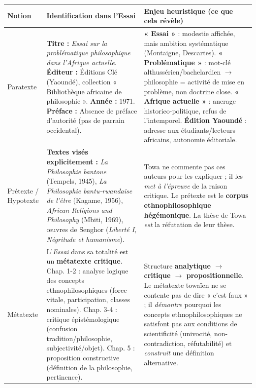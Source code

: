 \documentclass[11pt]{article}
\newcommand{\cle}[1]{{\popxbold\color{popdark}#1}}
\begin{document}
\begin{center}
\begin{tabularx}{\linewidth}{|l|X|X|}
\hline
\rowcolor{popblueL}
\textbf{Notion} & \textbf{Identification dans l'Essai} & \textbf{Enjeu heuristique (ce que cela révèle)} \\
\hline
\cle{Paratexte} & \textbf{Titre :} \emph{Essai sur la problématique philosophique dans l'Afrique actuelle}. \textbf{Éditeur :} Éditions Clé (Yaoundé), collection « Bibliothèque africaine de philosophie ». \textbf{Année :} 1971. \textbf{Préface :} Absence de préface d'autorité (pas de parrain occidental). & \textbf{« Essai »} : modestie affichée, mais ambition systématique (Montaigne, Descartes). \textbf{« Problématique »} : mot-clé althussérien/bachelardien $\rightarrow$ philosophie = activité de mise en problème, non doctrine close. \textbf{« Afrique actuelle »} : ancrage historico-politique, refus de l'intemporel. \textbf{Édition Yaoundé} : adresse aux étudiants/lecteurs africains, autonomie éditoriale. \\
\hline
\cle{Prétexte / Hypotexte} & \textbf{Textes visés explicitement :} \emph{La Philosophie bantoue} (Tempels, 1945), \emph{La Philosophie bantu-rwandaise de l'être} (Kagame, 1956), \emph{African Religions and Philosophy} (Mbiti, 1969), œuvres de Senghor (\emph{Liberté I}, \emph{Négritude et humanisme}). & Towa ne commente pas ces auteurs pour les expliquer ; il les \emph{met à l'épreuve} de la raison critique. Le prétexte est le \textbf{corpus ethnophilosophique hégémonique}. La thèse de Towa \emph{est} la réfutation de leur thèse. \\
\hline
\cle{Métatexte} & L'\emph{Essai} dans sa totalité est un \textbf{métatexte critique}. Chap. 1-2 : analyse logique des concepts ethnophilosophiques (force vitale, participation, classes nominales). Chap. 3-4 : critique épistémologique (confusion tradition/philosophie, subjectivité/objet). Chap. 5 : proposition constructive (définition de la philosophie, pertinence). & Structure \textbf{analytique $\rightarrow$ critique $\rightarrow$ propositionnelle}. Le métatexte towaïen ne se contente pas de dire « c'est faux » ; il \emph{démontre} pourquoi les concepts ethnophilosophiques ne satisfont pas aux conditions de scientificité (univocité, non-contradiction, réfutabilité) et \emph{construit} une définition alternative. \\
\hline
\end{tabularx}
\end{center}
\end{document}
